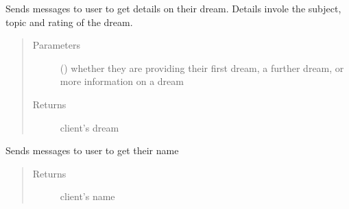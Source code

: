 \documentclass[letterpaper,10pt,english]{sphinxmanual}
\begin{document}
\begin{fulllineitems}
\begin{fulllineitems}
\begin{quote}
\begin{description}
\end{description}\end{quote}

\end{fulllineitems}


\begin{fulllineitems}
\label{\detokenize{index:Fralysis.Conversation.Conversation.get_dream}}
Sends messages to user to get details on their dream.
Details invole the subject, topic and rating of the dream.
\begin{quote}\begin{description}
\item[{Parameters}] \leavevmode
{} () \textendash{} whether they are providing their first dream, a further dream, or more information on a dream

\item[{Returns}] \leavevmode
client’s dream

\end{description}\end{quote}

\end{fulllineitems}


\begin{fulllineitems}
\label{\detokenize{index:Fralysis.Conversation.Conversation.get_name}}
Sends messages to user to get their name
\begin{quote}\begin{description}
\item[{Returns}] \leavevmode
client’s name

\end{description}\end{quote}

\end{fulllineitems}



\end{fulllineitems}
\end{document}
